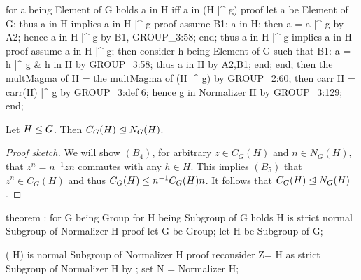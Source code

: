   for a being Element of G holds a in H iff a in (H |^ g)
  proof
    let a be Element of G;
    thus a in H implies a in H |^ g
    proof
      assume B1: a in H;
      then a = a |^ g by A2;
      hence a in H |^ g by B1, GROUP_3:58;
    end;
    thus a in H |^ g implies a in H
    proof
      assume a in H |^ g;
      then consider h being Element of G such that
      B1: a = h |^ g & h in H
      by GROUP_3:58;
      thus a in H by A2,B1;
    end;
  end;
  then the multMagma of H = the multMagma of (H |^ g) by GROUP_2:60;
  then carr H = carr(H) |^ g by GROUP_3:def 6;
  hence g in Normalizer H by GROUP_3:129;
end;
\nwendcode{}\nwdocspar

\begin{theorem}
Let $H\leq G$. Then $C_{G}(H)\trianglelefteq N_{G}(H)$.
\end{theorem}

\begin{proof}[Proof sketch]
We will show $(B_{4})$, for arbitrary $z\in C_{G}(H)$ and $n\in N_{G}(H)$, that
$z^{n}=n^{-1}zn$ commutes with any $h\in H$. This implies $(B_{5})$ that
$z^{n}\in C_{G}(H)$ and thus $C_{G}(H)\leq n^{-1}C_{G}(H)n$. It
follows that $C_{G}(H)\trianglelefteq N_{G}(H)$.
\end{proof}

\nwenddocs{}\endmoddef\nwstartdeflinemarkup{}\nwenddeflinemarkup
theorem :
  for G being Group
  for H being Subgroup of G
  holds  H is strict normal Subgroup of Normalizer H
proof
  let G be Group;
  let H be Subgroup of G;

  ( H) is normal Subgroup of Normalizer H
  proof
    reconsider Z= H as strict Subgroup of Normalizer H by ;
    set N = Normalizer H;

